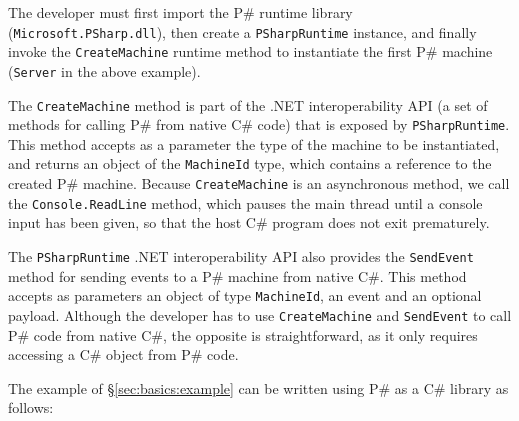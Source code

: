 \documentclass{llncs}
\newcommand{\ps}{P\#\xspace}
\newcommand{\cs}{C\#\xspace}
\begin{document}
\noindent
The developer must first import the \ps runtime library (\texttt{Microsoft.PSharp.dll}), then create a \texttt{PSharpRuntime} instance, and finally invoke the \texttt{CreateMachine} runtime method to instantiate the first \ps machine (\texttt{Server} in the above example).

The \texttt{CreateMachine} method is part of the .NET interoperability API (a set of methods for calling \ps from native \cs code) that is exposed by \texttt{PSharpRuntime}. This method accepts as a parameter the type of the machine to be instantiated, and returns an object of the \texttt{MachineId} type, which contains a reference to the created \ps machine. Because \texttt{CreateMachine} is an asynchronous method, we call the \texttt{Console.ReadLine} method, which pauses the main thread until a console input has been given, so that the host \cs program does not exit prematurely.

The \texttt{PSharpRuntime} .NET interoperability API also provides the \texttt{SendEvent} method for sending events to a \ps machine from native \cs. This method accepts as parameters an object of type \texttt{MachineId}, an event and an optional payload. Although the developer has to use \texttt{CreateMachine} and \texttt{SendEvent} to call \ps code from native \cs, the opposite is straightforward, as it only requires accessing a \cs object from \ps code.

The example of \S\ref{sec:basics:example} can be written using \ps as a \cs library as follows:
\end{document}
